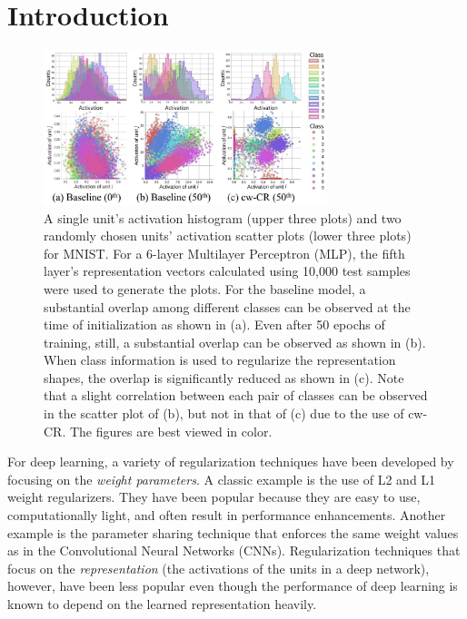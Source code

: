 \section{Introduction}
%

\begin{figure}[t]
\centering
\centerline{\includegraphics[width=8.25cm]{mnist_none_hist_scatter.pdf}}
\caption{
A single unit's activation histogram (upper three plots) and two randomly chosen units' activation scatter plots (lower three plots) for MNIST. For a 6-layer Multilayer Perceptron (MLP), the fifth layer's representation vectors calculated using 10,000 test samples were used to generate the plots. For the baseline model, a substantial overlap among different classes can be observed at the time of initialization as shown in (a). Even after 50 epochs of training, still, a substantial overlap can be observed as shown in (b). When class information is used to regularize the representation shapes, the overlap is significantly reduced as shown in (c). Note that a slight correlation between each pair of classes can be observed in the scatter plot of (b), but not in that of (c) due to the use of cw-CR. The figures are best viewed in color.
}
\label{fig:mnist_none_hist_scatter}
\end{figure}

For deep learning, a variety of regularization techniques have been developed by focusing on the \textit{weight parameters}. A classic example is the use of L2 \cite{hoerl1970ridge} and L1 \cite{tibshirani1996regression} weight regularizers. They have been popular because they are easy to use, computationally light, and often result in performance enhancements. Another example is the parameter sharing technique that enforces the same weight values as in the Convolutional Neural Networks (CNNs).  
Regularization techniques that focus on the \textit{representation} (the activations of the units in a deep network), however, have been less popular even though the performance of deep learning is known to depend on the learned representation heavily. 

